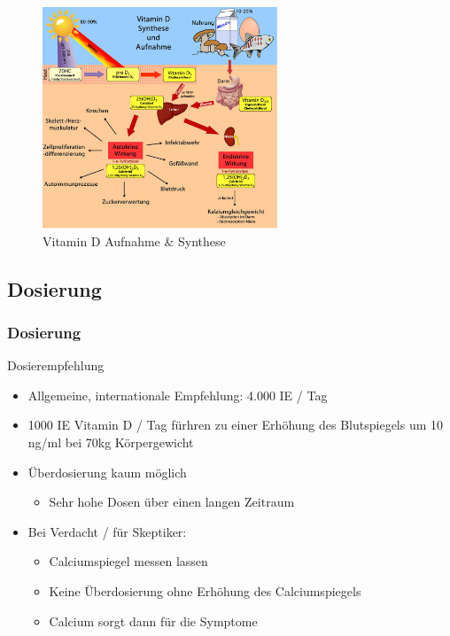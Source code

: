 \documentclass[xcolor=dvipsnames]{beamer}
\begin{document}
\begin{frame}[allowframebreaks]
        \framebreak

        \begin{figure}
            \includegraphics[width=7cm]{../images/vitamin_d_synthese.png}
            \caption{Vitamin D Aufnahme \& Synthese}
        \end{figure}
    \end{frame}

    \subsection{Dosierung}
    \begin{frame}
        \frametitle{Dosierung}
        \begin{block}{Dosierempfehlung}
            \begin{itemize}
                \setlength\itemsep{1em}
                \item Allgemeine, internationale Empfehlung: 4.000 IE / Tag
                \item 1000 IE Vitamin D / Tag fürhren zu einer Erhöhung des Blutspiegels um 10 ng/ml bei 70kg Körpergewicht
                \item Überdosierung kaum möglich
                \begin{itemize}
                    \item Sehr hohe Dosen über einen langen Zeitraum
                \end{itemize}
                \item Bei Verdacht / für Skeptiker:
                \begin{itemize}
                    \item Calciumspiegel messen lassen
                    \item Keine Überdosierung ohne Erhöhung des Calciumspiegels
                    \item Calcium sorgt dann für die Symptome
                \end{itemize}
            \end{itemize}
        \end{block}
    \end{frame}
\end{document}
